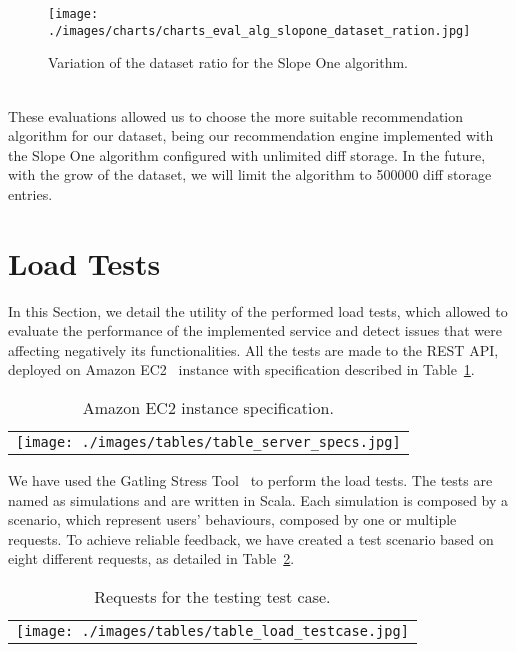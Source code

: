 \begin{figure}[h!]
 \centering
   \texttt{[image: ./images/charts/charts\_eval\_alg\_slopone\_dataset\_ration.jpg]}
   \caption{Variation of the dataset ratio for the Slope One algorithm.}
   \label{fig:chartTrainingTestSet}
\end{figure}\\
These evaluations allowed us to choose the more suitable recommendation algorithm for our dataset, being our recommendation engine implemented with the Slope One algorithm configured with unlimited diff storage. In the future, with the grow of the dataset, we will limit the algorithm to 500000 diff storage entries.

\section{Load Tests}
\label{subsec:loadTests}
In this Section, we detail the utility of the performed load tests, which allowed to evaluate the performance of the implemented service and detect issues that were affecting negatively its functionalities. All the tests are made to the REST API, deployed on Amazon EC2~\cite{amazonEC2} instance with specification described in Table~\ref{tab:ec2Specs}.
\begin{center}
\begin{table}
	\centering
    \caption{Amazon EC2 instance specification.}
    \label{tab:ec2Specs}
    \begin{tabular}{c}
	\texttt{[image: ./images/tables/table\_server\_specs.jpg]}
    \end{tabular}
    \end{table}
\end{center}
We have used the Gatling Stress Tool~\cite{gatling} to perform the load tests. The tests are named as simulations and are written in Scala. Each simulation is composed by a scenario, which represent users' behaviours, composed by one or multiple requests. To achieve reliable feedback, we have created a test scenario based on eight different requests, as detailed in Table~\ref{tab:testcase}. 
\begin{center}
\begin{table}
	\centering
    \caption{Requests for the testing test case.}
    \label{tab:testcase}
    \begin{tabular}{c}
	\texttt{[image: ./images/tables/table\_load\_testcase.jpg]}
    \end{tabular}
    \end{table}
\end{center}
